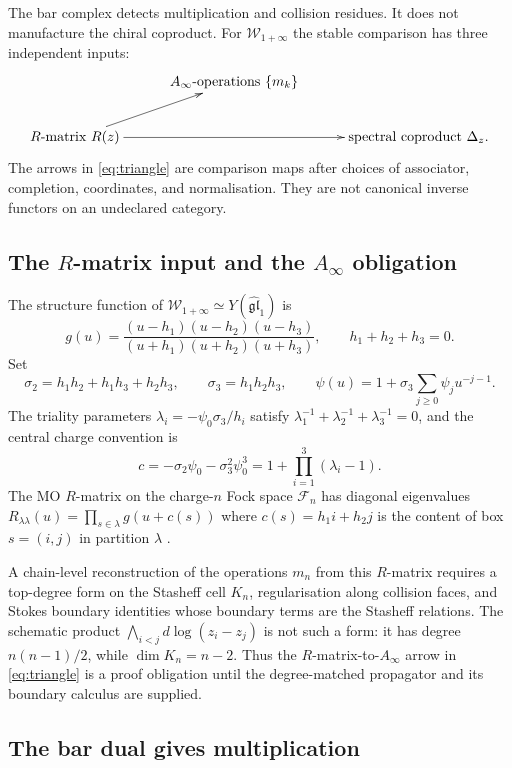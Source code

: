 \documentclass[11pt]{article}
\theoremstyle{remark}
\providecommand{\fgl}{\mathfrak{gl}}
\providecommand{\Ainf}{A_\infty}
\begin{document}
The bar complex detects multiplication and collision residues.  It does
not manufacture the chiral coproduct.  For
$\mathcal{W}_{1+\infty}$ the stable comparison has three independent
inputs:
\begin{equation}\label{eq:triangle}
\xymatrix@C=3em{
& \Ainf\text{-operations } \{m_k\} \\
R\text{-matrix } R(z) \ar[ur] \ar[rr]
&& \text{spectral coproduct } \Delta_z .
}
\end{equation}
The arrows in \eqref{eq:triangle} are comparison maps after choices of
associator, completion, coordinates, and normalisation.  They are not
canonical inverse functors on an undeclared category.

\subsection*{The $R$-matrix input and the $A_\infty$ obligation}

The structure function of $\mathcal{W}_{1+\infty} \simeq
Y(\widehat{\fgl}_1)$ is
\begin{equation}\label{eq:structure-fn}
g(u) = \frac{(u - h_1)(u - h_2)(u - h_3)}{(u + h_1)(u + h_2)(u + h_3)},
\qquad h_1 + h_2 + h_3 = 0.
\end{equation}
Set
\[
  \sigma_2=h_1h_2+h_1h_3+h_2h_3,\qquad
  \sigma_3=h_1h_2h_3,\qquad
  \psi(u)=1+\sigma_3\sum_{j\ge0}\psi_j u^{-j-1}.
\]
The triality parameters
$\lambda_i=-\psi_0\sigma_3/h_i$ satisfy
$\lambda_1^{-1}+\lambda_2^{-1}+\lambda_3^{-1}=0$, and the
central charge convention is
\[
  c=-\sigma_2\psi_0-\sigma_3^2\psi_0^3
  =1+\prod_{i=1}^3(\lambda_i-1).
\]
The MO $R$-matrix on the charge-$n$ Fock space $\mathcal{F}_n$ has
diagonal eigenvalues
$R_{\lambda\lambda}(u) = \prod_{s \in \lambda} g(u + c(s))$
where $c(s) = h_1 i + h_2 j$ is the content of box $s = (i,j)$
in partition $\lambda$ \cite{Vol3}.

A chain-level reconstruction of the operations $m_n$ from this
$R$-matrix requires a top-degree form on the Stasheff cell $K_n$,
regularisation along collision faces, and Stokes boundary identities
whose boundary terms are the Stasheff relations.  The schematic product
$\bigwedge_{i<j}d\log(z_i-z_j)$ is not such a form: it has degree
$n(n-1)/2$, while $\dim K_n=n-2$.  Thus the $R$-matrix-to-$A_\infty$
arrow in \eqref{eq:triangle} is a proof obligation until the
degree-matched propagator and its boundary calculus are supplied.

\subsection*{The bar dual gives multiplication}
\end{document}
